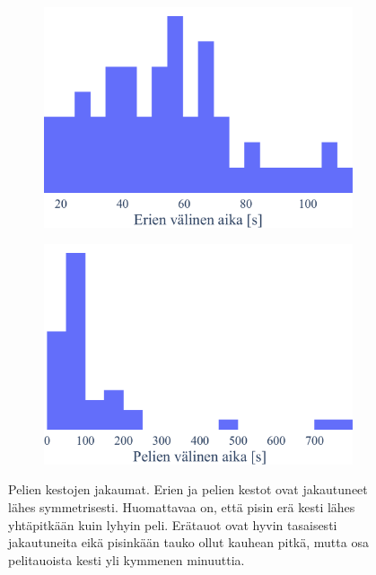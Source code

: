 \begin{figure}[!ht]
\begin{subfigure}[b]{0.4\textwidth}
           \includegraphics[width=\textwidth]{figures/pelit3.pdf}
       \end{subfigure}
       \hfill
       \begin{subfigure}[b]{0.4\textwidth}
           \centering
           \includegraphics[width=\textwidth]{figures/pelit4.pdf}
       \end{subfigure}
       \caption{
        Pelien kestojen jakaumat.
        Erien ja pelien kestot ovat jakautuneet lähes symmetrisesti.
        Huomattavaa on, että pisin erä kesti lähes yhtäpitkään kuin lyhyin peli.
        Erätauot ovat hyvin tasaisesti jakautuneita eikä pisinkään tauko ollut kauhean pitkä,
        mutta osa pelitauoista kesti yli kymmenen minuuttia.\label{fig:games}
        }
    \end{figure}
   
